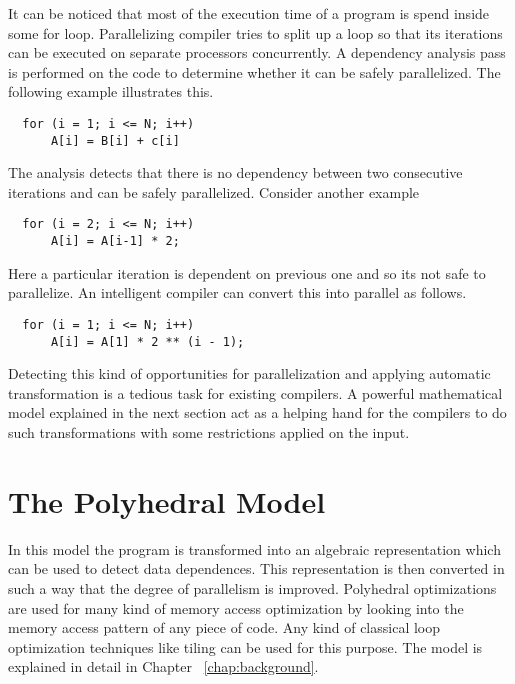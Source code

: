 It can be noticed that most of the execution time of a program is spend inside some
for loop. Parallelizing compiler tries to split up a loop so that its iterations can
be executed on separate processors concurrently. A dependency analysis pass is 
performed on the code to determine whether it can be safely parallelized. The following
example illustrates this.

{\footnotesize
\begin{lstlisting}
  for (i = 1; i <= N; i++)
      A[i] = B[i] + c[i]
\end{lstlisting}
}

The analysis detects that there is no dependency between two consecutive iterations and
can be safely parallelized. Consider another example

{\footnotesize
\begin{lstlisting}
  for (i = 2; i <= N; i++)
      A[i] = A[i-1] * 2;
\end{lstlisting}
}

Here a particular iteration is dependent on previous one and so its not safe to parallelize.
An intelligent compiler can convert this into parallel as follows.

{\footnotesize
\begin{lstlisting}
  for (i = 1; i <= N; i++)
      A[i] = A[1] * 2 ** (i - 1);
\end{lstlisting}
}

Detecting this kind of opportunities for parallelization and applying automatic transformation
is a tedious task for existing compilers. A powerful mathematical model explained in the next
section act as a helping hand for the compilers to do such transformations with some
restrictions applied on the input.

\section{The Polyhedral Model}

In this model the program is transformed into an algebraic representation which can be used to
detect data dependences. This representation is then converted in such a way that the degree
of parallelism is improved. Polyhedral optimizations are used for many kind of memory access optimization by
looking into the memory access pattern of any piece of code. Any kind of classical
 loop optimization techniques like tiling can be used for this purpose. The model is
explained in detail in Chapter ~\ref{chap:background}.

